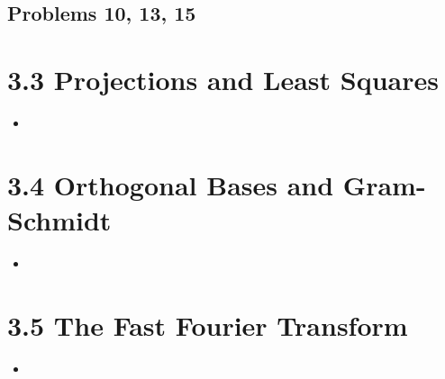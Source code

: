 \begin{itemize}
  \subsection{Problems 10, 13, 15}
  \begin{itemize}


  \end{itemize}

\end{itemize}

\section{3.3 Projections and Least Squares}
\begin{itemize}
  \item []


\end{itemize}

\section{3.4 Orthogonal Bases and Gram-Schmidt}
\begin{itemize}
  \item []


\end{itemize}

\section{3.5 The Fast Fourier Transform}
\begin{itemize}
  \item []

\end{itemize}
